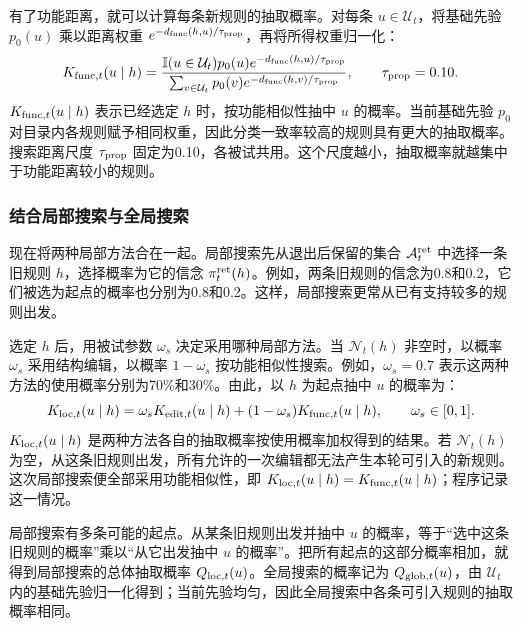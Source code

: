 \documentclass[12pt]{article}
\newcommand{\ind}{\mathbb I}
\begin{document}
有了功能距离，就可以计算每条新规则的抽取概率。对每条 $u\in\mathcal U_t$，将基础先验 $p_0(u)$ 乘以距离权重 $e^{-d_{\rm func}(h,u)/\tau_{\rm prop}}$，再将所得权重归一化：
\begin{equation}
K_{{\rm func},t}(u\mid h)=
\frac{\ind(u\in\mathcal U_t)p_0(u)e^{-d_{\rm func}(h,u)/\tau_{\rm prop}}}
{\sum_{v\in\mathcal U_t}p_0(v)e^{-d_{\rm func}(h,v)/\tau_{\rm prop}}},
\qquad\tau_{\rm prop}=0.10.
\label{eq:functional-proposal}
\end{equation}
$K_{{\rm func},t}(u\mid h)$ 表示已经选定 $h$ 时，按功能相似性抽中 $u$ 的概率。当前基础先验 $p_0$ 对目录内各规则赋予相同权重，因此分类一致率较高的规则具有更大的抽取概率。搜索距离尺度 $\tau_{\rm prop}$ 固定为0.10，各被试共用。这个尺度越小，抽取概率就越集中于功能距离较小的规则。

\subsubsection{结合局部搜索与全局搜索}

现在将两种局部方法合在一起。局部搜索先从退出后保留的集合 $\mathcal A_t^{\rm ret}$ 中选择一条旧规则 $h$，选择概率为它的信念 $\pi_t^{\rm ret}(h)$。例如，两条旧规则的信念为0.8和0.2，它们被选为起点的概率也分别为0.8和0.2。这样，局部搜索更常从已有支持较多的规则出发。

选定 $h$ 后，用被试参数 $\omega_s$ 决定采用哪种局部方法。当 $\mathcal N_t(h)$ 非空时，以概率 $\omega_s$ 采用结构编辑，以概率 $1-\omega_s$ 按功能相似性搜索。例如，$\omega_s=0.7$ 表示这两种方法的使用概率分别为70\%和30\%。由此，以 $h$ 为起点抽中 $u$ 的概率为：
\begin{equation}
K_{{\rm loc},t}(u\mid h)=\omega_sK_{{\rm edit},t}(u\mid h)
+(1-\omega_s)K_{{\rm func},t}(u\mid h),\qquad\omega_s\in[0,1].
\end{equation}
$K_{{\rm loc},t}(u\mid h)$ 是两种方法各自的抽取概率按使用概率加权得到的结果。若 $\mathcal N_t(h)$ 为空，从这条旧规则出发，所有允许的一次编辑都无法产生本轮可引入的新规则。这次局部搜索便全部采用功能相似性，即 $K_{{\rm loc},t}(u\mid h)=K_{{\rm func},t}(u\mid h)$；程序记录这一情况。

局部搜索有多条可能的起点。从某条旧规则出发并抽中 $u$ 的概率，等于“选中这条旧规则的概率”乘以“从它出发抽中 $u$ 的概率”。把所有起点的这部分概率相加，就得到局部搜索的总体抽取概率 $Q_{{\rm loc},t}(u)$。全局搜索的概率记为 $Q_{{\rm glob},t}(u)$，由 $\mathcal U_t$ 内的基础先验归一化得到；当前先验均匀，因此全局搜索中各条可引入规则的抽取概率相同。
\end{document}
